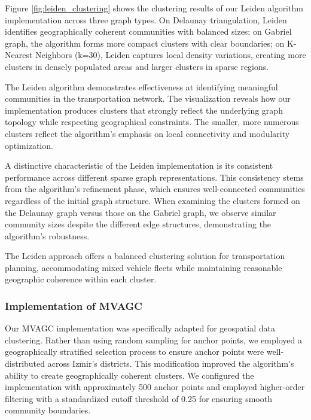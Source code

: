Figure \ref{fig:leiden_clustering} shows the clustering results of our Leiden algorithm implementation across three graph types. On Delaunay triangulation, Leiden identifies geographically coherent communities with balanced sizes; on Gabriel graph, the algorithm forms more compact clusters with clear boundaries; on K-Nearest Neighbors (k=30), Leiden captures local density variations, creating more clusters in densely populated areas and larger clusters in sparse regions.

The Leiden algorithm demonstrates effectiveness at identifying meaningful communities in the transportation network. The visualization reveals how our implementation produces clusters that strongly reflect the underlying graph topology while respecting geographical constraints. The smaller, more numerous clusters reflect the algorithm's emphasis on local connectivity and modularity optimization.

A distinctive characteristic of the Leiden implementation is its consistent performance across different sparse graph representations. This consistency stems from the algorithm's refinement phase, which ensures well-connected communities regardless of the initial graph structure. When examining the clusters formed on the Delaunay graph versus those on the Gabriel graph, we observe similar community sizes despite the different edge structures, demonstrating the algorithm's robustness.

The Leiden approach offers a balanced clustering solution for transportation planning, accommodating mixed vehicle fleets while maintaining reasonable geographic coherence within each cluster.

\subsubsection{Implementation of MVAGC}
\label{subsubsec:mvagc_implementation}

Our MVAGC implementation was specifically adapted for geospatial data clustering. Rather than using random sampling for anchor points, we employed a geographically stratified selection process to ensure anchor points were well-distributed across Izmir's districts. This modification improved the algorithm's ability to create geographically coherent clusters. We configured the implementation with approximately 500 anchor points and employed higher-order filtering with a standardized cutoff threshold of 0.25 for ensuring smooth community boundaries.

